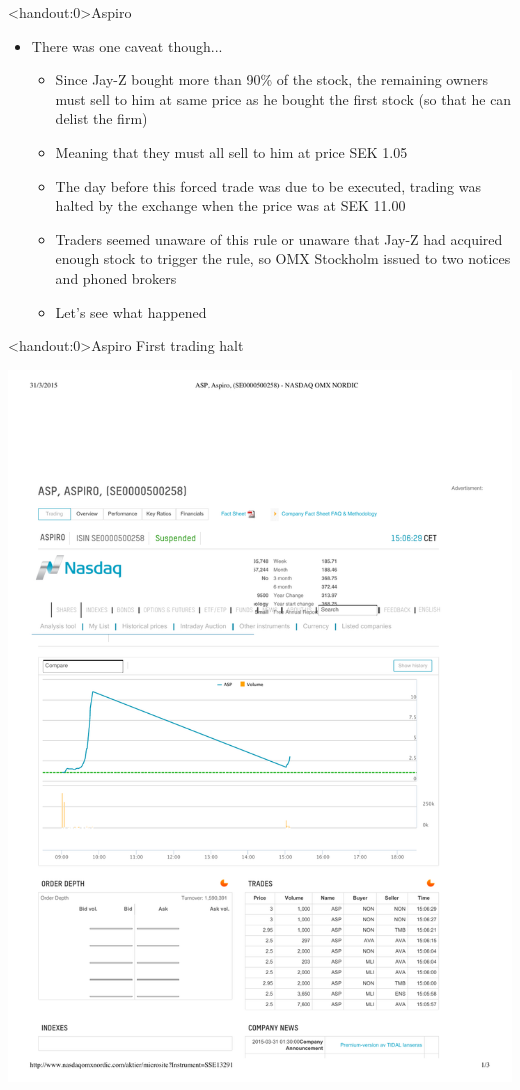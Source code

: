 \documentclass[english,10pt
,aspectratio=169
]{beamer}
\begin{document}
\begin{frame}<handout:0>{Aspiro}
	\begin{itemize}
		\item There was one caveat though...
		\begin{itemize}
			\item Since Jay-Z bought more than 90\% of the stock, the remaining owners must sell to him at same price as he bought the first stock (so that he can delist the firm)
			\item Meaning that they must all sell to him at price SEK 1.05
			\pause
			\item The day before this forced trade was due to be executed, trading was halted by the exchange when the price was at SEK 11.00
			\item Traders seemed unaware of this rule or unaware that Jay-Z had acquired enough stock to trigger the rule, so OMX Stockholm issued to two notices and phoned brokers
			\item Let's see what happened
		\end{itemize}
	\end{itemize}
\end{frame}


\begin{frame}<handout:0>{Aspiro}
	First trading halt
	
	\includegraphics{pics/aspiro1}
\end{frame}
\end{document}
